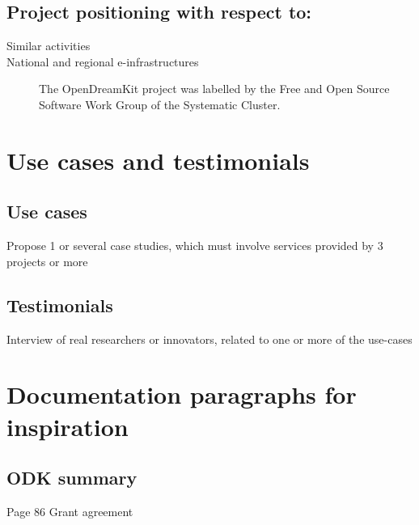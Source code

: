 \documentclass[12pt]{amsbook}
\begin{document}
\subsection{Project positioning with respect to:}
\begin{description}
\item[Similar activities]
\item[National and regional e-infrastructures]
The OpenDreamKit project was labelled by the Free and Open Source Software Work Group of the Systematic Cluster.

\end{description}

\section{Use cases and testimonials}
\subsection{Use cases}
Propose 1 or several case studies, which must involve services provided by 3 projects or more
\subsection{Testimonials}
Interview of real researchers or innovators, related to one or more of the use-cases


\section{Documentation paragraphs for inspiration}
\subsection{ODK summary}
Page 86 Grant agreement
\end{document}
